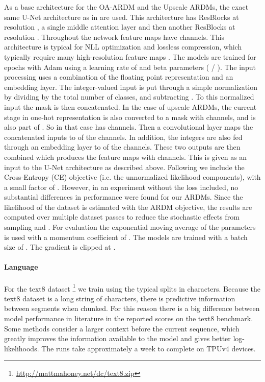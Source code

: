 \documentclass{article} \usepackage{iclr2022_conference,times}
\begin{document}
As a base architecture for the OA-ARDM and the Upscale ARDMs, the exact same U-Net architecture as in \citep{kingma2021vdm} are used. This architecture has  ResBlocks at resolution , a single middle attention layer and then another  ResBlocks at resolution . Throughout the network feature maps have  channels. This architecture is typical for NLL optimization and lossless compression, which typically require many high-resolution feature maps \citep{mentzer2019practicallossless}. The models are trained for  epochs with Adam using a learning rate of  and beta parameters ( / ). The input processing uses a combination of the floating point representation and an embedding layer. The integer-valued input is put through a simple normalization by dividing by the total number of classes, and subtracting . To this normalized input the mask  is then concatenated. In the case of upscale ARDMs, the current stage in one-hot representation is also converted to a mask with  channels, and is also part of . So in that case  has  channels. Then a  convolutional layer maps the concatenated inputs to  of the channels. In addition, the integers are also fed through an embedding layer to  of the channels. These two outputs are then combined which produces the feature maps with  channels. This is given as an input to the U-Net architecture as described above. Following \citet{austin2021structured} we include the Cross-Entropy (CE) objective  (i.e. the unnormalized likelihood components), with a small factor of . However, in an experiment without the  loss included, no substantial differences in performance were found for our ARDMs. Since the likelihood of the dataset is estimated with the ARDM objective, the results are computed over multiple dataset passes to reduce the stochastic effects from sampling  and . For evaluation the exponential moving average of the parameters is used with a momentum coefficient of . The models are trained with a batch size of . The gradient is clipped at .


\paragraph{Language}
For the text8 dataset \citep{mahoney2011large}\footnote{\href{http://mattmahoney.net/dc/text8.zip}{
http://mattmahoney.net/dc/text8.zip}} we train using the typical  splits in characters. Because the text8 dataset is a long string of characters, there is predictive information between segments when chunked. For this reason there is a big difference between model performance in literature in the reported scores on the text8 benchmark. Some methods consider a larger context before the current sequence, which greatly improves the information available to the model and gives better log-likelihoods. The runs take approximately a week to complete on  TPUv4 devices.
\end{document}
